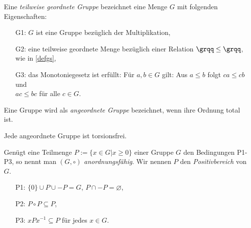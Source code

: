 %
\begin{defn}\label{twgG} %
Eine \textit{teilweise geordnete Gruppe} bezeichnet eine Menge $G$ mit folgenden Eigenschaften: 
%
\begin{enumerate}
\item[G1:] $G$ ist eine Gruppe bezüglich der Multiplikation,
\item[G2:] eine teilweise geordnete Menge bezüglich einer Relation $ \grqq\leq\grqq $, wie in \ref{defgs}, 
\item[G3:] das Monotoniegesetz ist erfüllt: Für $a, b \in  G$ gilt: Aus $a \leq b$ folgt $ca \leq  cb$ und \\ $ac \leq bc$ für alle $c \in G$.
\end{enumerate}
% 
\end{defn}
%
%
\begin{defn}\label{agG}
Eine Gruppe wird als \textit{angeordnete Gruppe} bezeichnet, wenn ihre Ordnung total ist.
\end{defn}
%
\begin{satz} \label{angeordnetFolgtTorsionsfrei} %
Jede angeordnete Gruppe ist torsionsfrei. 
\end{satz}
%
%
\begin{bem}\label{afG} %
%
Genügt eine Teilmenge $P := \lbrace x \in G | x \geq 0\rbrace$ einer Gruppe $G$ den Bedingungen P1- P3, so nennt man $\left(G,\circ\right)$ \textit{anordnungsfähig}. Wir nennen $P$ den \textit{Positivbereich} von $G$.
%
\begin{enumerate}
\item[P1:] $\lbrace0\rbrace \cup P\cup -P = G$, $P \cap -P = \varnothing$,
\item[P2:] $P \circ P \subseteq P$,
\item[P3:] $xPx^{-1} \subseteq P$ für jedes $x \in G$.
\end{enumerate}

\end{bem}
%

